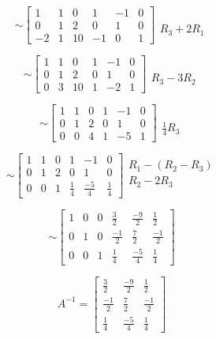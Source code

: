 \documentclass[12pt]{article}
\newcommand{\sqbrl}{\left[}
\newcommand{\sqbrr}{\right]}
\begin{document}
\[\sim \sqbrl\begin{array}{ccc|ccc}
1 & 1 & 0 & 1 & -1 & 0\\
0 & 1 & 2 & 0 & 1 & 0\\
 -2 & 1 & 10 & -1 & 0 & 1\end{array}\sqbrr
\begin{matrix}\\\\R_3 + 2R_1\end{matrix}\]

\[\sim \sqbrl\begin{array}{ccc|ccc}
1 & 1 & 0 & 1 & -1 & 0\\
0 & 1 & 2 & 0 & 1 & 0\\
 0 & 3 & 10 & 1 & -2 & 1\end{array}\sqbrr
\begin{matrix}\\\\R_3 - 3R_2\end{matrix}\]

\[\sim \sqbrl\begin{array}{ccc|ccc}
1 & 1 & 0 & 1 & -1 & 0\\
0 & 1 & 2 & 0 & 1 & 0\\ 
0 & 0 & 4 & 1 & -5 & 1\end{array}\sqbrr
\begin{matrix}\\\\\frac{1}{4}R_3\end{matrix}\]

\[\sim \sqbrl\begin{array}{ccc|ccc}
1 & 1 & 0 & 1 & -1 & 0\\
0 & 1 & 2 & 0 & 1 & 0\\ 
0 & 0 & 1 & \frac{1}{4} & \frac{-5}{4} & \frac{1}{4}\end{array}\sqbrr
\begin{matrix}R_1 - (R_2 - R_3)\\R_2 - 2R_3\\\end{matrix}\]

\[\sim \sqbrl\begin{array}{ccc|ccc}
1 & 0 & 0 & \frac{3}{2} & \frac{-9}{2} & \frac{1}{2}\\
0 & 1 & 0 & \frac{-1}{2} & \frac{7}{2} & \frac{-1}{2}\\ 
0 & 0 & 1 & \frac{1}{4} & \frac{-5}{4} & \frac{1}{4}\end{array}\sqbrr\]

\[ A^{-1} = \sqbrl\begin{matrix}\frac{3}{2} & \frac{-9}{2} & \frac{1}{2}\\\frac{-1}{2} & \frac{7}{2} & \frac{-1}{2}\\ \frac{1}{4} &\frac{-5}{4} & \frac{1}{4}\end{matrix}\sqbrr\]
\end{document}
